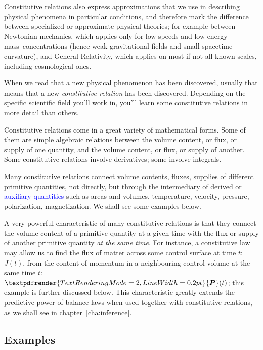 \documentclass[a4paper,12pt,%
onecolumn,oneside,%
british%
]{memoir}
\renewcommand*{\bm}[1]{\textpdfrender{TextRenderingMode=2,LineWidth=0.2pt}{\boldsymbol{#1}}}
\renewcommand*{\|}[1][]{\nonscript\:#1\vert\nonscript\:\mathopen{}}
\newcommand*{\sect}{\S}%
\newcommand*{\chap}{chapter}%
\renewcommand*{\autoref}[3][\sect\,\ref]{\textcolor{blue}{#3}
\raisebox{0.6ex}{\color{blue}\miniscule%
\faIcon{angle-right}%
\;#1{#2}\;p.\,\pageref{#2}}}
\newcommand*{\energym}{energy-mass}
\newcommand*{\yJ}{J}
\newcommand*{\yP}{\bm{P}}
\begin{document}
Constitutive relations also express approximations that we use in describing physical phenomena in particular conditions, and therefore mark the difference between specialized or approximate physical theories; for example between Newtonian mechanics, which applies only for low speeds and low \energym\ concentrations (hence weak gravitational fields and small spacetime curvature), and General Relativity, which applies on most if not all known scales, including cosmological ones.

When we read that a new physical phenomenon has been discovered, usually that means that a new \emph{constitutive relation} has been discovered. Depending on the specific scientific field you'll work in, you'll learn some constitutive relations in more detail than others.

\medskip

Constitutive relations come in a great variety of mathematical forms. Some of them are simple algebraic relations between the volume content, or flux, or supply of one quantity, and the volume content, or flux, or supply of another. Some constitutive relations involve derivatives; some involve integrals.

Many constitutive relations connect volume contents, fluxes, supplies of different primitive quantities, not directly, but through the intermediary of derived or \autoref{sec:aux_quantities}{auxiliary quantities} such as areas and volumes, temperature, velocity, pressure, polarization, magnetization. We shall see some examples below.

\medskip

A very powerful characteristic of many constitutive relations is that they connect the volume content of a primitive quantity at a given time with the flux or supply of another primitive quantity \emph{at the same time}. For instance, a constitutive law may allow us to find the flux of matter across some control surface at time $t$: $\yJ(t)$, from the content of momentum in a neighbouring control volume at the same time $t$: $\yP(t)$; this example is further discussed below. This characteristic greatly extends the predictive power of balance laws when used together with constitutive relations, as we shall see in \chap~\ref{cha:inference}.



\subsection{Examples}
\label{sec:example_constitutive}
\end{document}
